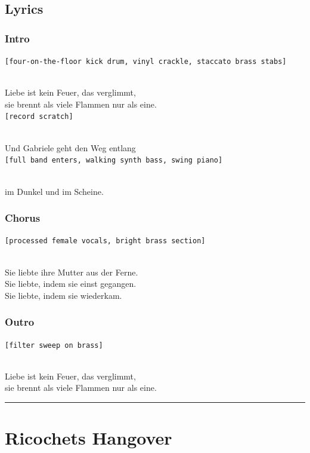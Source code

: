 \documentclass[]{article}
\begin{document}
\subsection{Lyrics}\label{lyrics-32}

\subsubsection{Intro}\label{intro-13}

\texttt{{[}four-on-the-floor\ kick\ drum,\ vinyl\ crackle,\ staccato\ brass\ stabs{]}}\strut \\
Liebe ist kein Feuer, das verglimmt,\\
sie brennt als viele Flammen nur als eine.\\
\texttt{{[}record\ scratch{]}}\strut \\
Und Gabriele geht den Weg entlang\\
\texttt{{[}full\ band\ enters,\ walking\ synth\ bass,\ swing\ piano{]}}\strut \\
im Dunkel und im Scheine.

\subsubsection{Chorus}\label{chorus-63}

\texttt{{[}processed\ female\ vocals,\ bright\ brass\ section{]}}\strut \\
Sie liebte ihre Mutter aus der Ferne.\\
Sie liebte, indem sie einst gegangen.\\
Sie liebte, indem sie wiederkam.

\subsubsection{Outro}\label{outro-11}

\texttt{{[}filter\ sweep\ on\ brass{]}}\strut \\
Liebe ist kein Feuer, das verglimmt,\\
sie brennt als viele Flammen nur als eine.

\begin{center}\rule{0.5\linewidth}{0.5pt}\end{center}

\section{Ricochets Hangover}\label{ricochets-hangover}
\end{document}
